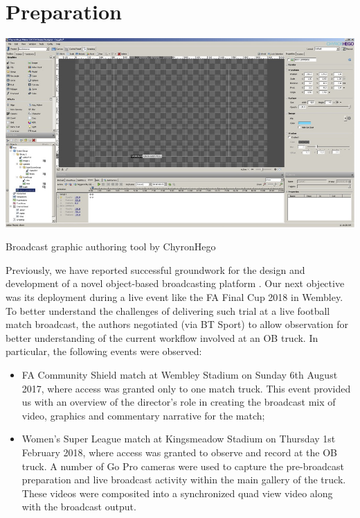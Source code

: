 \documentclass[sigchi-a, authorversion]{acmart}
\begin{document}
\section{Preparation}

\begin{marginfigure}
    \includegraphics[width=\marginparwidth]{Figures/ChyronHegotool.jpg}
    \caption{Broadcast graphic authoring tool by ChyronHego}
    \label{fig:chyronhego}
\end{marginfigure}

Previously, we have reported successful groundwork for the design and development
of a novel object-based broadcasting platform \cite{kegel2017, Li:2018_CHI, Li:2018_TVX}.
Our next objective was its deployment during a live event like the FA Final Cup
2018 in Wembley. To better understand the challenges of delivering such trial at
a live football match broadcast, the authors negotiated (via BT Sport) to allow
observation for better understanding of the current workflow involved at an OB
truck. In particular, the following events were observed:

\begin{itemize}
  \item FA Community Shield match at Wembley Stadium on Sunday 6th August 2017,
        where access was granted only to one match truck. This event provided us
        with an overview of the director's role in creating the broadcast mix of
        video, graphics and commentary narrative for the match;
  \item Women's Super League match at Kingsmeadow Stadium on Thursday 1st
        February 2018, where access was granted to observe and record at the OB
        truck. A number of Go Pro cameras were used to capture the pre-broadcast
        preparation and live broadcast activity within the main gallery of the
        truck. These videos were composited into a synchronized quad view video
        along with the broadcast output.
\end{itemize}
\end{document}
